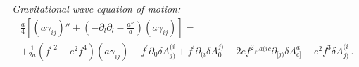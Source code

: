\noindent - \textit{Gravitational wave equation of motion:}
\begin{align}
&\frac{a}{4}\left[(a \gamma_{ij})'' + \left(-\partial_l\partial_l - \frac{a''}{a} \right) (a \gamma_{ij})\right] = \nonumber \\
&+ \frac{1}{2 a}( f^{\prime \ 2}- e^2 f^4 ) (a \gamma_{ij} ) -  f^\prime \partial_0 \delta A^{(i}_{j)}  + f^\prime \partial_{(i} \delta A^{j)}_0 - 2e f^2 \varepsilon^{a(ic}  \partial_{[j)} \delta A^a_{c]}  + e^2  f^3  \delta A^{(i}_{j)}  \, . 
\end{align}